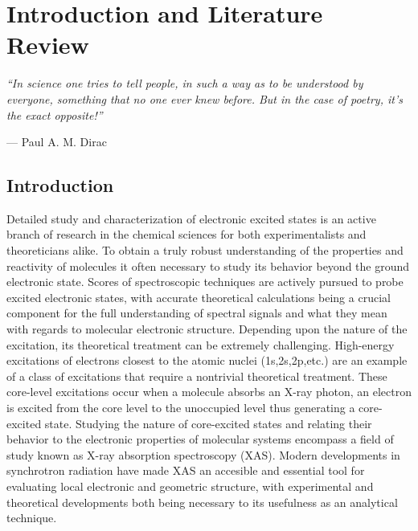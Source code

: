 \documentclass{article}
\begin{document}
\chapter{Introduction and Literature Review}
\epigraph{\textit{``In science one tries to tell people, in such a way as to be understood by everyone, something that no one ever knew before. But in the case of poetry, it's the exact opposite!''}}{--- Paul A. M. Dirac}
\section{Introduction}
Detailed study and characterization of electronic excited states is an active branch of research in the chemical sciences for both experimentalists and theoreticians alike.\cite{marguet_influence_1998,gonzalez_progress_2012,zhou_enhanced_1991,hirata_configuration_1999} To obtain a truly robust understanding of the properties and reactivity of molecules it often necessary to study its behavior beyond the ground electronic state. Scores of spectroscopic techniques are actively pursued to probe excited electronic states,\cite{harris_symmetry_1978} with accurate theoretical calculations being a crucial component for the full understanding of spectral signals and what they mean with regards to molecular electronic structure.\cite{serrano-andres_theoretical_1998,roos_multiconfigurational_1996} Depending upon the nature of the excitation, its theoretical treatment can be extremely challenging.\cite{autschbach_charge-transfer_2009,levine_conical_2006,prlj_low-lying_2016} High-energy excitations of electrons closest to the atomic nuclei (1s,2s,2p,etc.) are an example of a class of excitations that require a nontrivial theoretical treatment.\cite{nakata_time-dependent_2006} These core-level excitations occur when a molecule absorbs an X-ray photon, an electron is excited from the core level to the unoccupied level thus generating a core-excited state.\cite{penner-hahn_x-ray_1999} Studying the nature of core-excited states and relating their behavior to the electronic properties of molecular systems encompass a field of study known as X-ray absorption spectroscopy (XAS).\cite{stohr_nexafs_1992} Modern developments in synchrotron radiation\cite{snigirev_compound_1996,holch_new_2011} have made XAS an accesible and essential tool for evaluating local electronic and geometric structure, with experimental and theoretical developments both being necessary to its usefulness as an analytical technique. \cite{lee_extended_1981,rehr_theoretical_2000}
\end{document}
